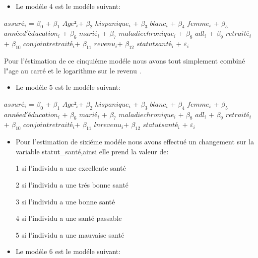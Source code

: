 \documentclass[
  14pt,
  french,
]{article}
\providecommand{\tightlist}{%
  \setlength{\itemsep}{0pt}\setlength{\parskip}{0pt}}
\begin{document}
\begin{itemize}
\tightlist
\item
  Le modéle 4 est le modéle suivant:
\end{itemize}

\begin{center}
$assuré_i$ = $\beta_0$  + $\beta_1$ $Age²_i$+ $\beta_2$ $hispanique_i$ + $\beta_3$ $blanc_i$ + $\beta_4$ $femme_i$  + $\beta_{5}$ $année d'éducation_i$ + $\beta_{6}$ $marié_i$ + $\beta_7$ $maladie chronique_i$  + $\beta_{8}$ $adl_i$ + $\beta_{9}$ $retraité_i$ + $\beta_{10}$ $conjoint retraité_i$+ $\beta_{11}$ $revenu_i$+ $\beta_{12}$ $statut santé_i$ + $\varepsilon_i$ 
\end{center}

Pour l'éstimation de ce cinquiéme modéle nous avons tout simplement
combiné l"age au carré et le logarithme sur le revenu .

\begin{itemize}
\tightlist
\item
  Le modéle 5 est le modéle suivant:
\end{itemize}

\begin{center}
$assuré_i$ = $\beta_0$  + $\beta_1$ $Age²_i$+ $\beta_2$ $hispanique_i$ + $\beta_3$ $blanc_i$ + $\beta_4$ $femme_i$  + $\beta_{5}$ $année d'éducation_i$ + $\beta_{6}$ $marié_i$ + $\beta_7$ $maladie chronique_i$  + $\beta_{8}$ $adl_i$ + $\beta_{9}$ $retraité_i$ + $\beta_{10}$ $conjoint retraité_i$+ $\beta_{11}$ $lnrevenu_i$+ $\beta_{12}$ $statut santé_i$ + $\varepsilon_i$ 
\end{center}

\begin{itemize}
\item
  Pour l'estimation de sixiéme modéle nous avons effectué un changement
  sur la variable statut\_santé,ainsi elle prend la valeur de:

  1 si l'individu a une excellente santé

  \linebreak

  2 si l'individu a une trés bonne santé

  \linebreak

  3 si l'individu a une bonne santé

  \linebreak

  4 si l'individu a une santé passable

  \linebreak

  5 si l'individu a une mauvaise santé

  \linebreak
\item
  Le modéle 6 est le modéle suivant:
\end{itemize}
\end{document}
